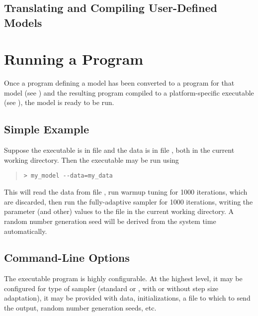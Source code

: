 \section{Translating and Compiling User-Defined Models}


\chapter{Running a \Stan Program}\label{stan-cmd.chapter}

\noindent 
Once a \Stan program defining a model has been converted to a \Cpp
program for that model (see ) and the resulting \Cpp
program compiled to a platform-specific executable (see
), the model is ready to be run.

\section{Simple Example}

Suppose the executable is in file  and the data
is in file , both in the current working directory.
Then the \Stan executable may be run using
%
\begin{quote}
\begin{Verbatim}[fontshape=sl]
> my_model --data=my_data
\end{Verbatim}
\end{quote}
%
This will read the data from file , run warmup tuning for
1000 iterations, which are discarded, then run the fully-adaptive
\NUTS sampler for 1000 iterations, writing the parameter (and other)
values to the file  in the current working
directory.  A random number generation seed will be derived from
the system time automatically.

\section{Command-Line Options}

The executable \Stan program is highly configurable.  At the highest
level, it may be configured for type of sampler (standard \HMC or
\NUTS, with or without step size adaptation), it may
be provided with data, initializations, a file to which to send the
output, random number generation seeds, etc.

